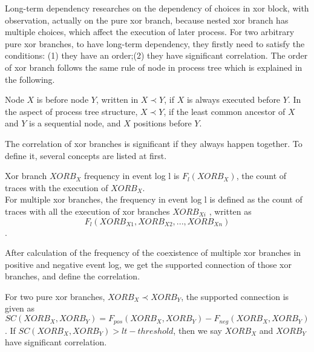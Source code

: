 
Long-term dependency researches on the dependency of choices in xor block, with observation, actually on the pure xor branch, because nested xor branch has multiple choices, which affect the execution of later process. For two arbitrary pure xor branches, to have long-term dependency, they firstly need to satisfy the conditions: (1) they have an order;(2) they have significant correlation.
The order of xor branch follows the same rule of node in process tree which is explained in the following.
\begin{definition}
	Node $X$ is before node $Y$, written in $X \prec Y$, if $X$ is always executed before $Y$.  In the aspect of process tree structure, $X \prec Y$, if the least common ancestor of $X$ and $Y$ is a sequential node, and $X$ positions before $Y$.
\end{definition} 
The correlation of xor branches is significant if they always happen together. To define it, several concepts are listed at first. 
\begin{definition}
	Xor branch $XORB_X$ frequency in event log l is $F_{l}(XORB_X)$, the count of traces with the execution of $XORB_X$. \\
	For multiple xor branches, the frequency in event log l is defined as the count of traces with all the execution of xor branches $XORB_{Xi}$ , written as \[F_{l}(XORB_{X1}, XORB_{X2},...,XORB_{Xn})\].
\end{definition}
After calculation of the frequency of the coexistence of multiple xor branches in positive and negative event log, we get the supported connection of those xor branches, and define the correlation. 
\begin{definition}
	\label{def: supported-connection}
	For two pure xor branches, $XORB_X \prec XORB_Y$, the supported connection is given as \[SC(XORB_X,XORB_Y)= F_{pos}(XORB_X, XORB_Y) -F_{neg}(XORB_X, XORB_Y)\]. If $SC(XORB_X,XORB_Y) > lt-threshold$, then we say $XORB_X$ and $XORB_Y$ have significant correlation.
\end{definition}

